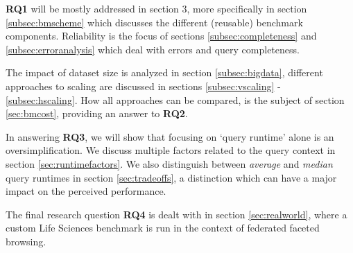 \textbf{RQ1} will be mostly addressed in section 3, more specifically in section \ref{subsec:bmscheme} which discusses the different (reusable) benchmark components. Reliability is the focus of sections \ref{subsec:completeness} and \ref{subsec:erroranalysis} which deal with errors and query completeness. 

The impact of dataset size is analyzed in section \ref{subsec:bigdata}, different approaches to scaling are discussed in sections \ref{subsec:vscaling} - \ref{subsec:hscaling}. How all approaches can be compared, is the subject of section \ref{sec:bmcost}, providing an answer to \textbf{RQ2}. 

In answering \textbf{RQ3}, we will show that focusing on `query runtime' alone is an oversimplification. We discuss multiple factors related to the query context in section \ref{sec:runtimefactors}. We also distinguish between \emph{average} and \emph{median} query runtimes in section \ref{sec:tradeoffs}, a distinction which can have a major impact on the perceived performance.

The final research question \textbf{RQ4} is dealt with in section \ref{sec:realworld}, where a custom Life Sciences benchmark is run in the context of federated faceted browsing. 

